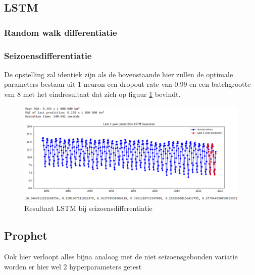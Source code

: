 \subsection{LSTM}
\subsubsection{Random walk differentiatie}


\subsubsection{Seizoensdifferentiatie}

De opstelling zal identiek zijn als de bovenstaande hier zullen de optimale parameters bestaan uit 1 neuron een dropout rate van 0.99 en een batchgrootte van 8 met het eindresultaat dat zich op figuur \ref{fig:uvslstmsdiff} bevindt.

\begin{figure}
    \centering
    \caption{Resultaat LSTM bij seizoensdifferentiatie}
    \label{fig:uvslstmsdiff}
    \includegraphics[width=1\linewidth]{uv_s_lstm_s_diff}
\end{figure}


\subsection{Prophet}

Ook hier verloopt alles bijna analoog met de niet seizoensgebonden variatie worden er hier wel 2 hyperparameters getest

